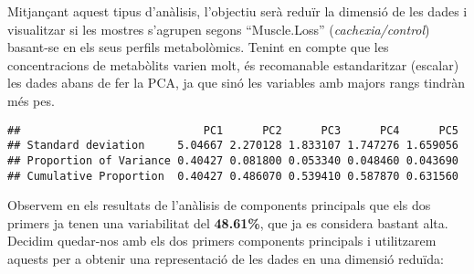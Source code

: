 \documentclass[
]{article}
\newenvironment{Shaded}{\begin{snugshade}}{\end{snugshade}}
\newcommand{\AttributeTok}[1]{\textcolor[rgb]{0.13,0.29,0.53}{#1}}
\newcommand{\CommentTok}[1]{\textcolor[rgb]{0.56,0.35,0.01}{\textit{#1}}}
\newcommand{\ConstantTok}[1]{\textcolor[rgb]{0.56,0.35,0.01}{#1}}
\newcommand{\DecValTok}[1]{\textcolor[rgb]{0.00,0.00,0.81}{#1}}
\newcommand{\FunctionTok}[1]{\textcolor[rgb]{0.13,0.29,0.53}{\textbf{#1}}}
\newcommand{\NormalTok}[1]{#1}
\newcommand{\OtherTok}[1]{\textcolor[rgb]{0.56,0.35,0.01}{#1}}
\newcommand{\SpecialCharTok}[1]{\textcolor[rgb]{0.81,0.36,0.00}{\textbf{#1}}}
\begin{document}
Mitjançant aquest tipus d'anàlisis, l'objectiu serà reduïr la dimensió
de les dades i visualitzar si les mostres s'agrupen segons
``Muscle.Loss'' (\emph{cachexia/control}) basant-se en els seus perfils
metabolòmics. Tenint en compte que les concentracions de metabòlits
varien molt, és recomanable estandaritzar (escalar) les dades abans de
fer la PCA, ja que sinó les variables amb majors rangs tindràn més pes.

\begin{Shaded}
\end{Shaded}

\begin{verbatim}
##                            PC1      PC2      PC3      PC4      PC5
## Standard deviation     5.04667 2.270128 1.833107 1.747276 1.659056
## Proportion of Variance 0.40427 0.081800 0.053340 0.048460 0.043690
## Cumulative Proportion  0.40427 0.486070 0.539410 0.587870 0.631560
\end{verbatim}

\begin{Shaded}
\end{Shaded}

Observem en els resultats de l'anàlisis de components principals que els
dos primers ja tenen una variabilitat del \textbf{48.61\%}, que ja es
considera bastant alta. Decidim quedar-nos amb els dos primers
components principals i utilitzarem aquests per a obtenir una
representació de les dades en una dimensió reduïda:
\end{document}
